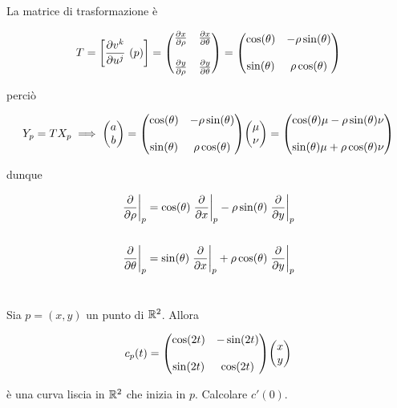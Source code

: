 La matrice di trasformazione è

\begin{equation}
	T = \left[ \pdv{v^{k}}{u^{j}}\ (p) \right] = \mqty( \pdv{x}{\rho} & \pdv{x}{\theta} \\\\ \pdv{y}{\rho} & \pdv{y}{\theta} ) %
	= \mqty( \cos(\theta) & - \rho \sin(\theta) \\\\ \sin(\theta) & \rho \cos(\theta) )
\end{equation}

perciò

\begin{equation}
	Y_{p} = T X_{p} %
	\implies %
	\mqty( a \\ b ) = \mqty( \cos(\theta) & - \rho \sin(\theta) \\\\ \sin(\theta) & \rho \cos(\theta) ) \mqty( \mu \\ \nu ) = \mqty( \cos(\theta) \mu - \rho \sin(\theta) \nu \\\\ \sin(\theta) \mu + \rho \cos(\theta) \nu )
\end{equation}

dunque

\begin{align}
	\begin{split}
		\eval{\pdv{\rho}}_{p} &= \cos(\theta) \eval{\pdv{x}}_{p} - \rho \sin(\theta) \eval{\pdv{y}}_{p}\\\\
		\eval{\pdv{\theta}}_{p} &= \sin(\theta) \eval{\pdv{x}}_{p} + \rho \cos(\theta) \eval{\pdv{y}}_{p}
	\end{split}
\end{align}

%

\newpage

%

\section{}\label{es2-10}

\begin{tcolorbox}
	Sia $ p = (x,y) $ un punto di $ \mathbb{R}^{2} $. Allora
	
	\begin{equation}
		c_{p}(t) = \mqty( \cos(2t) & -\sin(2t) \\\\ \sin(2t) & \cos(2t) ) \mqty(x \\ y)
	\end{equation}
	
	è una curva liscia in $ \mathbb{R}^{2} $ che inizia in $ p $. Calcolare $ c'(0) $.
\end{tcolorbox}

